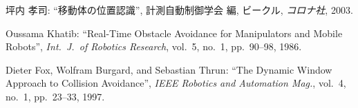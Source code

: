 \documentclass[uplatex, twocolumn, 9pt]{jsproceedings}
\begin{document}
\begin{thebibliography}{99}
坪内 孝司: ``移動体の位置認識'', 計測自動制御学会 編, ビークル, \textit{コロナ社}, 2003.

Oussama Khatib: ``Real-Time Obstacle Avoidance for Manipulators and Mobile Robots'', \textit{Int.\ J.\ of Robotics Research}, vol.~5, no.~1, pp.~90--98, 1986.

Dieter Fox, Wolfram Burgard, and Sebastian Thrun: ``The Dynamic Window Approach to Collision Avoidance'', \textit{IEEE Robotics and Automation Mag.}, vol.~4, no.~1, pp.~23--33, 1997.

\end{thebibliography}
\normalsize
\end{document}
